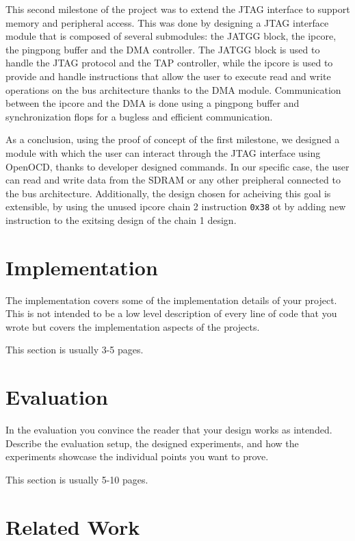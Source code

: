 \documentclass[a4paper,11pt,oneside]{report}
\begin{document}
This second milestone of the project was to extend the JTAG interface to support memory and peripheral access.
This was done by designing a JTAG interface module that is composed of several submodules: the JATGG block, the ipcore, the pingpong buffer and the DMA controller.
The JATGG block is used to handle the JTAG protocol and the TAP controller, while the ipcore is used to provide and handle instructions
that allow the user to execute read and write operations on the bus architecture thanks to the DMA module. 
Communication between the ipcore and the DMA is done using a pingpong buffer and synchronization flops for a bugless and efficient communication.

As a conclusion, using the proof of concept of the first milestone, 
we designed a module with which the user can interact through the JTAG interface using OpenOCD, thanks to developer designed commands.
In our specific case, the user can read and write data from the SDRAM or any other preipheral connected to the bus architecture. 
Additionally, the design chosen for acheiving this goal is extensible, by using the unused ipcore chain 2 instruction \texttt{0x38} ot by adding new instruction to the 
exitsing design of the chain 1 design.


\chapter{Implementation}

The implementation covers some of the implementation details of your project.
This is not intended to be a low level description of every line of code that
you wrote but covers the implementation aspects of the projects.

This section is usually 3-5 pages.


\chapter{Evaluation}

In the evaluation you convince the reader that your design works as intended.
Describe the evaluation setup, the designed experiments, and how the
experiments showcase the individual points you want to prove.

This section is usually 5-10 pages.


\chapter{Related Work}
\end{document}
